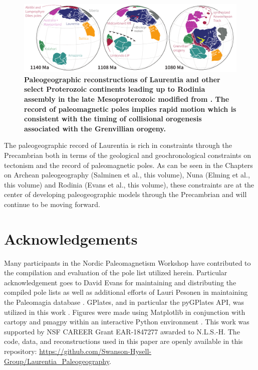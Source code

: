 \documentclass[11pt,letterpaper]{article}
\begin{document}
\begin{figure}
\centering
\includegraphics[width=\textwidth]{../Figures/Grenville_Reconstruction.pdf}
\caption{\small{\textbf{Paleogeographic reconstructions of Laurentia and other select Proterozoic continents leading up to Rodinia assembly in the late Mesoproterozoic modified from \cite{Swanson-Hysell2019a}. The record of paleomagnetic poles implies rapid motion which is consistent with the timing of collisional orogenesis associated with the Grenvillian orogeny.}}}
\label{fig:Grenville_reconstructions}
\end{figure} 

The paleogeographic record of Laurentia is rich in constraints through the Precambrian both in terms of the geological and geochronological constraints on tectonism and the record of paleomagnetic poles. As can be seen in the Chapters on Archean paleogeography (Salminen et al., this volume), Nuna (Elming et al., this volume) and Rodinia (Evans et al., this volume), these constraints are at the center of developing paleogeographic models through the Precambrian and will continue to be moving forward.

\section*{Acknowledgements}

Many participants in the Nordic Paleomagnetism Workshop have contributed to the compilation and evaluation of the pole list utilized herein. Particular acknowledgement goes to David Evans for maintaining and distributing the compiled pole lists as well as additional efforts of Lauri Pesonen in maintaining the Paleomagia database \citep{Veikkolainen2014a}. GPlates, and in particular the pyGPlates API, was utilized in this work \citep{Muller2018b}. Figures were made using Matplotlib \citep{Hunter2007a} in conjunction with cartopy \citep{Met-Office2010a} and pmagpy \citep{Tauxe2016a} within an interactive Python environment \citep{Perez2007a}. This work was supported by NSF CAREER Grant EAR-1847277 awarded to N.L.S.-H. The code, data, and reconstructions used in this paper are openly available in this repository: \url{https://github.com/Swanson-Hysell-Group/Laurentia_Paleogeography}. 
\end{document}
